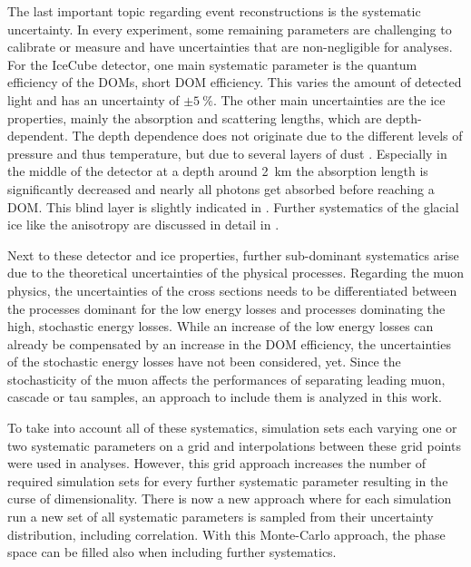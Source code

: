 The last important topic regarding event reconstructions is the systematic uncertainty.
In every experiment, some remaining parameters are challenging to calibrate or measure and have uncertainties that are non-negligible for analyses.
For the IceCube detector, one main systematic parameter is the quantum efficiency of the DOMs, short DOM efficiency.
This varies the amount of detected light and has an uncertainty of $\pm\SI{5}{\percent}$.
The other main uncertainties are the ice properties, mainly the absorption and scattering lengths, which are depth-dependent.
The depth dependence does not originate due to the different levels of pressure and thus temperature, but due to several layers of dust \cite{Icecube06ice, Icecube13ice}.
Especially in the middle of the detector at a depth around \SI{2}{km} the absorption length is significantly decreased and nearly all photons get absorbed before reaching a DOM.
This blind layer is slightly indicated in .
Further systematics of the glacial ice like the anisotropy are discussed in detail in \cite{Rongen19PhD}.

Next to these detector and ice properties, further sub-dominant systematics arise due to the theoretical uncertainties of the physical processes.
Regarding the muon physics, the uncertainties of the cross sections needs to be differentiated between the processes dominant for the low energy losses and processes dominating the high, stochastic energy losses.
While an increase of the low energy losses can already be compensated by an increase in the DOM efficiency, the uncertainties of the stochastic energy losses have not been considered, yet.
Since the stochasticity of the muon affects the performances of separating leading muon, cascade or tau samples, an approach to include them is analyzed in this work.

To take into account all of these systematics, simulation sets each varying one or two systematic parameters on a grid and interpolations between these grid points were used in analyses.
However, this grid approach increases the number of required simulation sets for every further systematic parameter resulting in the curse of dimensionality.
There is now a new approach \cite{IceCube2019SnowStorm} where for each simulation run a new set of all systematic parameters is sampled from their uncertainty distribution, including correlation.
With this Monte-Carlo approach, the phase space can be filled also when including further systematics.
